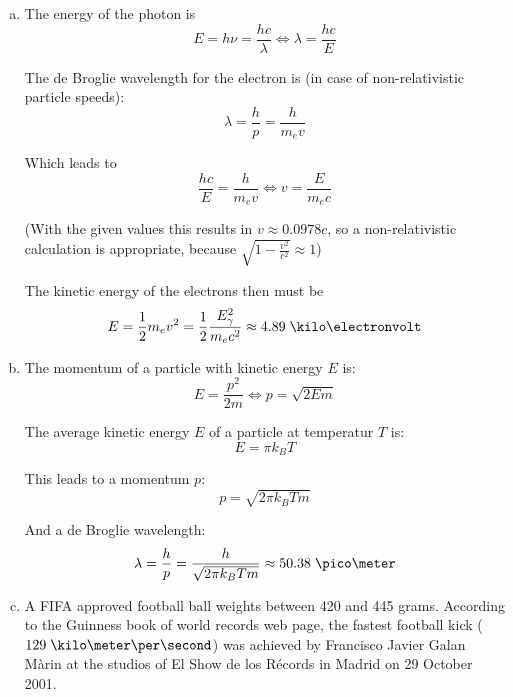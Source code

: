 \documentclass[a4paper,german,12pt,smallheadings]{scrartcl}
\begin{document}
\begin{enumerate}[a)]
  \item
    The energy of the photon is
    \begin{equation*}
      E = h \nu = \frac{hc}{\lambda} \Leftrightarrow \lambda = \frac{hc}{E}
    \end{equation*}

    The de Broglie wavelength for the electron is (in case of non-relativistic particle speeds):
    \begin{equation*}
      \lambda = \frac{h}{p} = \frac{h}{m_e v}
    \end{equation*}

    Which leads to
    \begin{equation*}
      \frac{hc}{E} = \frac{h}{m_e v} \Leftrightarrow v = \frac{E}{m_e c}
    \end{equation*}

    (With the given values this results in $v \approx 0.0978 c$, so a
    non-relativistic calculation is appropriate, because $\sqrt{1 -
    \frac{v^2}{c^2}} \approx 1$)

    The kinetic energy of the electrons then must be
    \begin{equation*}
      E = \frac{1}{2} m_ev^2 = \frac{1}{2} \frac{E_\gamma^2}{m_e c^2} \approx 4.89 \; \kilo\electronvolt
    \end{equation*}
  \item
    The momentum of a particle with kinetic energy $E$ is:
    \begin{equation*}
      E = \frac{p^2}{2m} \Leftrightarrow p = \sqrt{2 E m}
    \end{equation*}

    The average kinetic energy $E$ of a particle at temperatur $T$ is:
    \begin{equation*}
      E = \pi k_B T
    \end{equation*}

    This leads to a momentum $p$:
    \begin{equation*}
      p = \sqrt{2 \pi k_B T m}
    \end{equation*}

    And a de Broglie wavelength:
    \begin{equation*}
      \lambda = \frac{h}{p} = \frac{h}{\sqrt{2 \pi k_B T m}} \approx 50.38 \; \pico\meter
    \end{equation*}

  \item
    A FIFA approved football ball weights between 420 and 445 grams. According
    to the Guinness book of world records web page, the fastest football kick
    ($129 \;\kilo\meter\per\second$) was achieved by Francisco Javier Galan
    Màrin at the studios of El Show de los Récords in Madrid on 29 October
    2001.


\end{enumerate}
\end{document}
